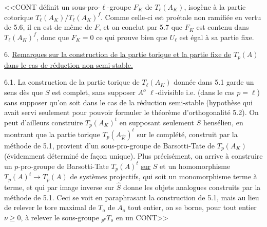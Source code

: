 
<<CONT définit un sous-pro-$\ell$-groupe $F_K$ de $T_\ell(A_K)$, isogène à la partie cotorique $T_\ell(A_K)/T_\ell(A_K)^f$. Comme celle-ci est proétale non ramifiée en vertu de 5.6, il en est de même de $F$, et on conclut par 5.7 que $F_K$ est contenu dans $T_\ell(A_K)^f$, donc que $F_K = 0$ ce qui prouve bien que $U_\ell$ est égal à sa partie fixe.


6. \underline{Remarques sur la construction de la partie torique et la partie fixe de} $T_p(A)$ \underline{dans le cas de réduction non semi-stable.}

6.1. La construction de la partie torique de $T_\ell(A_K)$ donnée dans 5.1 garde un sens dès que $S$ est complet, sans supposer $A^o$ $\ell$-divisible i.e. (dans le cas $p = \ell$) sans supposer qu'on soit dans le cas de la réduction semi-stable (hypothèse qui avait servi seulement pour pouvoir formuler le théorème d'orthogonalité 5.2). On peut d'ailleurs construire $T_p(A_K)^t$ en supposant seulement $S$ hensélien, en montrant que la partie torique $T_p(A_{\hat{K}})^t$ sur le complété, construit par la méthode de 5.1, provient d'un sous-pro-groupe de Barsotti-Tate de $T_p(A_K)$ (évidemment déterminé de façon unique). Plus précisément, on arrive à construire un $p$-pro-groupe de Barsotti-Tate $T_p(A)^t$ \underline{sur} $S$ et un homomorphisme $T_p(A)^t \longrightarrow T_p(A)$ de systèmes projectifs, qui soit un monomorphisme terme à terme, et qui par image inverse sur $\hat{S}$ donne les objets analogues construits par la méthode de 5.1. Ceci se voit en paraphrasant la construction de 5.1, mais au lieu de relever le tore maximal de $T_o$ de $A_o$ tout entier, on se borne, pour tout entier $\nu \geq 0$, à relever le sous-groupe ${}_{p^\nu}T_o$ en un CONT>>



